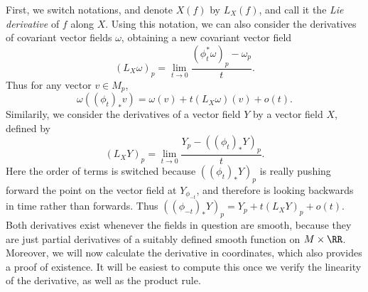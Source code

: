 First, we switch notations, and denote $X(f)$ by $L_X(f)$, and call it the \emph{Lie derivative} of $f$ along $X$. Using this notation, we can also consider the derivatives of covariant vector fields $\omega$, obtaining a new covariant vector field
%
\[ (L_X \omega)_p = \lim_{t \to 0} \frac{(\phi_t^*\omega)_p - \omega_p}{t}. \]
%
%
%
%
%
%
%
%
Thus for any vector $v \in M_p$,
%
\[ \omega((\phi_t)_* v) = \omega(v) + t (L_X \omega)(v) + o(t). \]
%
Similarily, we consider the derivatives of a vector field $Y$ by a vector field $X$, defined by
%
\[ (L_X Y)_p = \lim_{t \to 0} \frac{Y_p - ((\phi_t)_* Y)_p}{t}. \]
%
Here the order of terms is switched because $((\phi_t)_* Y)_p$ is really pushing forward the point on the vector field at $Y_{\phi_{-t}}$, and therefore is looking backwards in time rather than forwards. Thus $((\phi_{-t})_* Y)_p = Y_p + t (L_X Y)_p + o(t)$. Both derivatives exist whenever the fields in question are smooth, because they are just partial derivatives of a suitably defined smooth function on $M \times \RR$. Moreover, we will now calculate the derivative in coordinates, which also provides a proof of existence. It will be easiest to compute this once we verify the linearity of the derivative, as well as the product rule.

